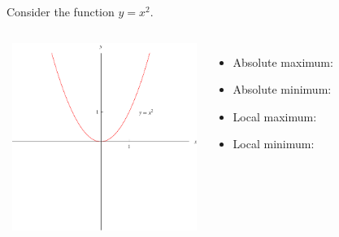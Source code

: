 \begin{frame}
\begin{example}[Example 2, p. 205]
Consider the function $y = x^2$.
\begin{columns}[c]
\ \includegraphics[width=6cm]{maxima-minima/pictures/01-02-xsquared.pdf}%
\begin{itemize}
\item<1-| alert@2-3>  Absolute maximum: 
\item<1-| alert@4-5>  Absolute minimum: 
\item<1-| alert@6-7>  Local maximum: 
\item<1-| alert@8-9>  Local minimum: 
\end{itemize}
\end{columns}
\end{example}
\end{frame}
